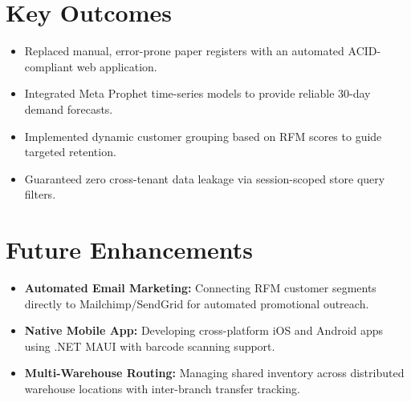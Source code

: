 \documentclass[12pt,a4paper]{report}
\begin{document}
\section{Key Outcomes}
\begin{itemize}
    \item Replaced manual, error-prone paper registers with an automated ACID-compliant web application.
    \item Integrated Meta Prophet time-series models to provide reliable 30-day demand forecasts.
    \item Implemented dynamic customer grouping based on RFM scores to guide targeted retention.
    \item Guaranteed zero cross-tenant data leakage via session-scoped store query filters.
\end{itemize}

\section{Future Enhancements}
\begin{itemize}
    \item \textbf{Automated Email Marketing:} Connecting RFM customer segments directly to Mailchimp/SendGrid for automated promotional outreach.
    \item \textbf{Native Mobile App:} Developing cross-platform iOS and Android apps using .NET MAUI with barcode scanning support.
    \item \textbf{Multi-Warehouse Routing:} Managing shared inventory across distributed warehouse locations with inter-branch transfer tracking.
\end{itemize}
\end{document}
